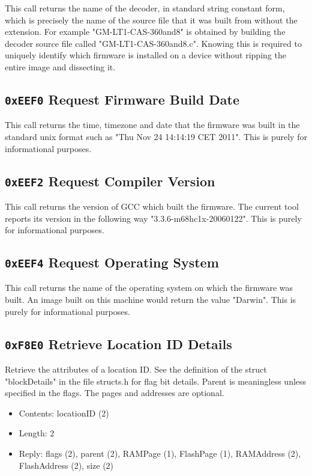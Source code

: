 \documentclass[12pt,a4paper,titlepage]{article}
\begin{document}
This call returns the name of the decoder, in standard string constant form, which is precisely the name of the source file that it was built from without the extension. For example "GM-LT1-CAS-360and8" is obtained by building the decoder source file called "GM-LT1-CAS-360and8.c". Knowing this is required to uniquely identify which firmware is installed on a device without ripping the entire image and dissecting it.


\subsection{\texttt{0xEEF0} Request Firmware Build Date}

This call returns the time, timezone and date that the firmware was built in the standard unix format such as "Thu Nov 24 14:14:19 CET 2011". This is purely for informational purposes.


\subsection{\texttt{0xEEF2} Request Compiler Version}

This call returns the version of GCC which built the firmware. The current tool reports its version in the following way "3.3.6-m68hc1x-20060122". This is purely for informational purposes.


\subsection{\texttt{0xEEF4} Request Operating System}

This call returns the name of the operating system on which the firmware was built. An image built on this machine would return the value "Darwin". This is purely for informational purposes.


\subsection{\texttt{0xF8E0} Retrieve Location ID Details}

Retrieve the attributes of a location ID.  See the definition of the struct "blockDetails" in the file structs.h for flag bit details. Parent is meaningless unless specified in the flags. The pages and addresses are optional.

\begin{itemize}
\item Contents: locationID (2)
\item Length: 2
\item Reply: flags (2), parent (2), RAMPage (1), FlashPage (1), RAMAddress (2), FlashAddress (2), size (2)
\end{itemize}
\end{document}
